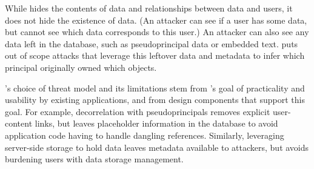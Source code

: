 %
While \sys hides the contents of \xxed data and relationships between \xxed data
and users, it does not hide the existence of
\xxed data. (An attacker can see if
a user has \xxed some data, but cannot see which \xxed data corresponds to this
user.)
%
An attacker can also see any data left in the database, such as pseudoprincipal
data or embedded text.
%
\sys puts out of scope attacks that leverage this leftover data
and metadata to infer which principal originally owned which objects.
%

\sys's choice of threat model and its limitations stem from
\sys's goal of practicality and usability by existing applications, and
from design components that support this goal.
%
For example, decorrelation with pseudoprincipals removes explicit user-content
links, but leaves placeholder information in the database to avoid application
code having to handle dangling references.
%
Similarly, leveraging server-side storage to hold \xxed data leaves
metadata available to attackers, but avoids burdening users with data storage
management.
